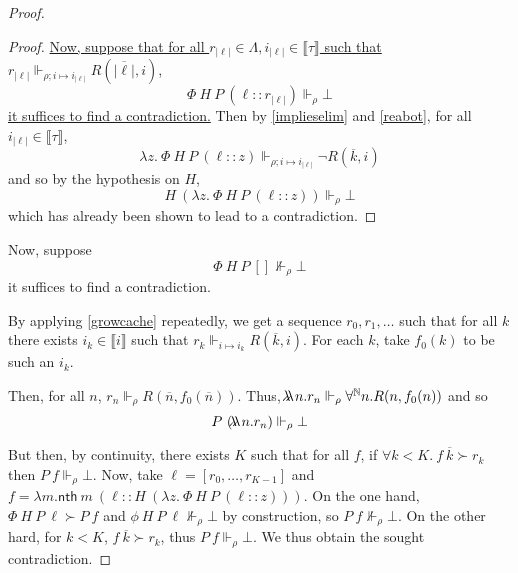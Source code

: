 \documentclass{article}
\newcommand{\N}{\mathbb{N}}
\newcommand{\depforall}[1]{\forall^\N #1.}
\newcommand{\realizes}{\Vdash}
\newcommand{\oracle}[2]{\lambda\mkern-15mu\lambda\ #1. #2}
\newcommand{\typeinterp}[1]{{\llbracket #1 \rrbracket}}
\newcommand{\nth}{\mathsf{nth}}
\newcommand{\length}[1]{{|#1|}}
\begin{document}
\begin{proof}
\begin{proof}
    \ul{Now, suppose that for all $r_\length{\ell} \in \Lambda, i_\length{\ell} \in \typeinterp{\tau}$ such that $r_\length{\ell} \realizes_{\rho; i \mapsto i_\length{\ell}} R(\overline{\length\ell}, i)$},
    \[ \Phi\ H\ P\ (\ell :: r_\length{\ell}) \realizes_\rho \bot \]
    \ul{it suffices to find a contradiction.}
    Then by \cref{implieselim} and \cref{reabot}, for all $i_\length{\ell} \in \typeinterp{\tau}$,
    \[ \lambda z.\ \Phi\ H\ P\ (\ell :: z) \realizes_{\rho; i \mapsto i_\length{\ell}} \neg R(\overline{k}, i) \]
    and so by the hypothesis on $H$,
    \[ H\ (\lambda z.\ \Phi\ H\ P\ (\ell :: z)) \realizes_\rho \bot \]
    which has already been shown to lead to a contradiction.
\end{proof}

Now, suppose
\[ \Phi\ H\ P\ [] \not\realizes_\rho \bot \]
it suffices to find a contradiction.

By applying \cref{growcache} repeatedly, we get a sequence $r_0, r_1, \dots$ such that for all $k$ there exists $i_k \in \typeinterp{i}$ such that $r_k \realizes_{i \mapsto i_k} R(\overline{k}, i)$.
For each $k$, take $f_0(k)$ to be such an $i_k$.

Then, for all $n$, $r_n \realizes_\rho R(\overline{n}, f_0(\overline{n}))$.
Thus, $\oracle{n}{r_n} \realizes_\rho \depforall{n} R(n, f_0(n))$ and so \[P\ (\oracle{n}{r_n}) \realizes_\rho \bot\]

But then, by continuity, there exists $K$ such that for all $f$, if $\forall k < K.\ f\ \overline{k} \succ r_k$ then $P\ f \realizes_\rho \bot$.
Now, take $\ell = [r_0, \dots, r_{K-1}]$ and $f = \lambda m. \nth\ m\ (\ell :: H\ (\lambda z. \ \Phi\ H\ P\ (\ell :: z)))$.
On the one hand, $\Phi\ H\ P\ \ell \succ P\ f$ and $\phi\ H\ P\ \ell \not\realizes_\rho \bot$ by construction, so $P\ f \not\realizes_\rho \bot$.
On the other hard, for $k < K$, $f\ \overline{k} \succ r_k$, thus $P\ f \realizes_\rho \bot$.
We thus obtain the sought contradiction.

\end{proof}
\end{document}
